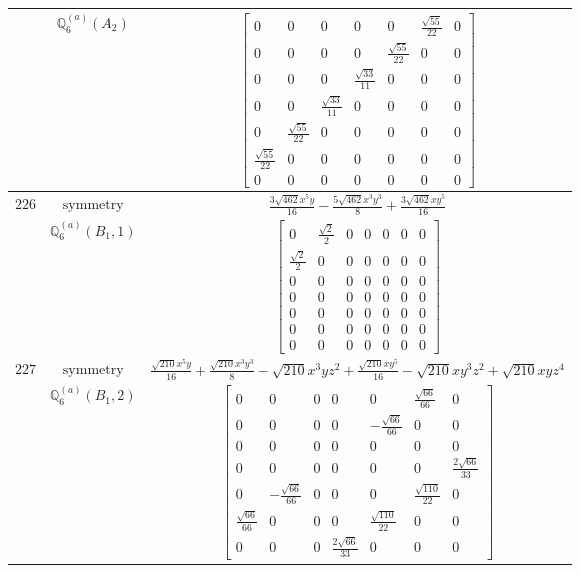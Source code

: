 \documentclass[fleqn,8pt,landscape]{jsarticle}
\begin{document}
\begin{longtable}{ccc}
$  $ & $ \mathbb{Q}_{6}^{(a)}(A_{2}) $ & $ \begin{bmatrix} 0 & 0 & 0 & 0 & 0 & \frac{\sqrt{55}}{22} & 0 \\ 0 & 0 & 0 & 0 & \frac{\sqrt{55}}{22} & 0 & 0 \\ 0 & 0 & 0 & \frac{\sqrt{33}}{11} & 0 & 0 & 0 \\ 0 & 0 & \frac{\sqrt{33}}{11} & 0 & 0 & 0 & 0 \\ 0 & \frac{\sqrt{55}}{22} & 0 & 0 & 0 & 0 & 0 \\ \frac{\sqrt{55}}{22} & 0 & 0 & 0 & 0 & 0 & 0 \\ 0 & 0 & 0 & 0 & 0 & 0 & 0 \end{bmatrix} $ \\ \hline
$ 226 $ & $ \text{symmetry} $ & $ \frac{3 \sqrt{462} x^{5} y}{16} - \frac{5 \sqrt{462} x^{3} y^{3}}{8} + \frac{3 \sqrt{462} x y^{5}}{16} $ \\
$  $ & $ \mathbb{Q}_{6}^{(a)}(B_{1},1) $ & $ \begin{bmatrix} 0 & \frac{\sqrt{2}}{2} & 0 & 0 & 0 & 0 & 0 \\ \frac{\sqrt{2}}{2} & 0 & 0 & 0 & 0 & 0 & 0 \\ 0 & 0 & 0 & 0 & 0 & 0 & 0 \\ 0 & 0 & 0 & 0 & 0 & 0 & 0 \\ 0 & 0 & 0 & 0 & 0 & 0 & 0 \\ 0 & 0 & 0 & 0 & 0 & 0 & 0 \\ 0 & 0 & 0 & 0 & 0 & 0 & 0 \end{bmatrix} $ \\ \hline
$ 227 $ & $ \text{symmetry} $ & $ \frac{\sqrt{210} x^{5} y}{16} + \frac{\sqrt{210} x^{3} y^{3}}{8} - \sqrt{210} x^{3} y z^{2} + \frac{\sqrt{210} x y^{5}}{16} - \sqrt{210} x y^{3} z^{2} + \sqrt{210} x y z^{4} $ \\
$  $ & $ \mathbb{Q}_{6}^{(a)}(B_{1},2) $ & $ \begin{bmatrix} 0 & 0 & 0 & 0 & 0 & \frac{\sqrt{66}}{66} & 0 \\ 0 & 0 & 0 & 0 & - \frac{\sqrt{66}}{66} & 0 & 0 \\ 0 & 0 & 0 & 0 & 0 & 0 & 0 \\ 0 & 0 & 0 & 0 & 0 & 0 & \frac{2 \sqrt{66}}{33} \\ 0 & - \frac{\sqrt{66}}{66} & 0 & 0 & 0 & \frac{\sqrt{110}}{22} & 0 \\ \frac{\sqrt{66}}{66} & 0 & 0 & 0 & \frac{\sqrt{110}}{22} & 0 & 0 \\ 0 & 0 & 0 & \frac{2 \sqrt{66}}{33} & 0 & 0 & 0 \end{bmatrix} $ \\ \hline

\end{longtable}
\end{document}
